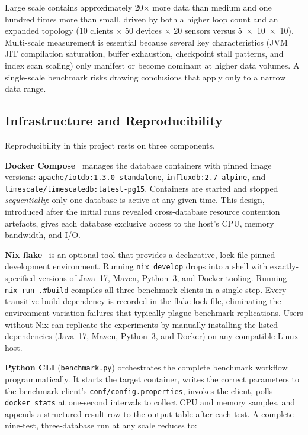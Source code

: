 Large scale contains approximately 20$\times$ more data than medium and one hundred times more
than small, driven by both a higher loop count and an expanded topology (10 clients
$\times$ 50 devices $\times$ 20 sensors versus 5~$\times$~10~$\times$~10). Multi-scale
measurement is essential because several key characteristics (JVM JIT compilation
saturation, buffer exhaustion, checkpoint stall patterns, and index scan scaling) only
manifest or become dominant at higher data volumes. A single-scale benchmark risks drawing
conclusions that apply only to a narrow data range.

\subsection{Infrastructure and Reproducibility}
\label{sec:infrastructure}

Reproducibility in this project rests on three components.

\textbf{Docker Compose}~\cite{docker} manages the database containers with pinned image
versions: \texttt{apache/iotdb:1.3.0-standalone}, \texttt{influxdb:2.7-alpine}, and
\texttt{timescale/timescaledb:latest-pg15}. Containers are started and stopped
\textit{sequentially}: only one database is active at any given time. This design, introduced
after the initial runs revealed cross-database resource contention artefacts, gives each
database exclusive access to the host's CPU, memory bandwidth, and I/O.

\textbf{Nix flake}~\cite{nixos} is an optional tool that provides a declarative,
lock-file-pinned development environment. Running \texttt{nix~develop} drops into a shell
with exactly-specified versions of Java~17, Maven, Python~3, and Docker tooling. Running
\texttt{nix~run~.\#build} compiles all three benchmark clients in a single step. Every
transitive build dependency is recorded in the flake lock file, eliminating the
environment-variation failures that typically plague benchmark replications. Users without
Nix can replicate the experiments by manually installing the listed dependencies (Java~17,
Maven, Python~3, and Docker) on any compatible Linux host.

\textbf{Python CLI} (\texttt{benchmark.py}) orchestrates the complete benchmark workflow
programmatically. It starts the target container, writes the correct parameters to
the benchmark client's \texttt{conf/config.properties}, invokes the client, polls
\texttt{docker~stats} at one-second intervals to collect CPU and memory samples, and appends
a structured result row to the output table after each test. A complete nine-test,
three-database run at any scale reduces to:

